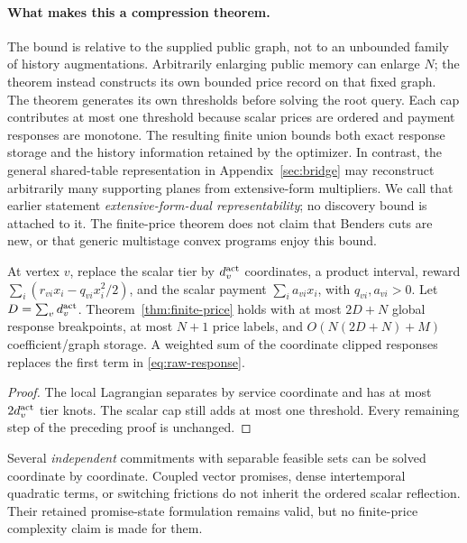 \paragraph{What makes this a compression theorem.}
The bound is relative to the supplied public graph, not to an unbounded family of history augmentations. Arbitrarily enlarging public memory can enlarge $N$; the theorem instead constructs its own bounded price record on that fixed graph. The theorem generates its own thresholds before solving the root query. Each cap contributes at most one threshold because scalar prices are ordered and payment responses are monotone. The resulting finite union bounds both exact response storage and the history information retained by the optimizer. In contrast, the general shared-table representation in Appendix~\ref{sec:bridge} may reconstruct arbitrarily many supporting planes from extensive-form multipliers. We call that earlier statement \emph{extensive-form-dual representability}; no discovery bound is attached to it. The finite-price theorem does not claim that Benders cuts are new, or that generic multistage convex programs enjoy this bound.

\begin{corollary}\label{cor:vector-tiers}
At vertex $v$, replace the scalar tier by $d_v^{\rm act}$ coordinates, a product interval, reward $\sum_i(r_{vi}x_i-q_{vi}x_i^2/2)$, and the scalar payment $\sum_i a_{vi}x_i$, with $q_{vi},a_{vi}>0$. Let $D=\sum_vd_v^{\rm act}$. Theorem~\ref{thm:finite-price} holds with at most $2D+N$ global response breakpoints, at most $N+1$ price labels, and $O(N(2D+N)+M)$ coefficient/graph storage. A weighted sum of the coordinate clipped responses replaces the first term in \eqref{eq:raw-response}.
\end{corollary}
\begin{proof}
The local Lagrangian separates by service coordinate and has at most $2d_v^{\rm act}$ tier knots. The scalar cap still adds at most one threshold. Every remaining step of the preceding proof is unchanged.
\end{proof}
Several \emph{independent} commitments with separable feasible sets can be solved coordinate by coordinate. Coupled vector promises, dense intertemporal quadratic terms, or switching frictions do not inherit the ordered scalar reflection. Their retained promise-state formulation remains valid, but no finite-price complexity claim is made for them.

